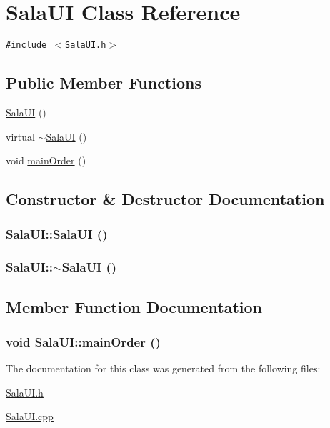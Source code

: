 \hypertarget{class_sala_u_i}{
\section{Sala\-UI Class Reference}
\label{class_sala_u_i}
}
{\tt \#include $<$Sala\-UI.h$>$}

\subsection*{Public Member Functions}
\begin{CompactItemize}
\item 
\hyperlink{class_sala_u_i_2fd138dfa2c3efa7c8ca6864147e5d04}{Sala\-UI} ()
\item 
virtual \hyperlink{class_sala_u_i_5ec383a7722b1f6b7425e115471dbfdf}{$\sim$Sala\-UI} ()
\item 
void \hyperlink{class_sala_u_i_d30e21f7319d652c2a2fd88dc274cfbc}{main\-Order} ()
\end{CompactItemize}


\subsection{Constructor \& Destructor Documentation}
\hypertarget{class_sala_u_i_2fd138dfa2c3efa7c8ca6864147e5d04}{
\subsubsection[SalaUI]{\setlength{\rightskip}{0pt plus 5cm}Sala\-UI::Sala\-UI ()}}
\label{class_sala_u_i_2fd138dfa2c3efa7c8ca6864147e5d04}


\hypertarget{class_sala_u_i_5ec383a7722b1f6b7425e115471dbfdf}{
\subsubsection[$\sim$SalaUI]{\setlength{\rightskip}{0pt plus 5cm}Sala\-UI::$\sim$Sala\-UI ()}}
\label{class_sala_u_i_5ec383a7722b1f6b7425e115471dbfdf}




\subsection{Member Function Documentation}
\hypertarget{class_sala_u_i_d30e21f7319d652c2a2fd88dc274cfbc}{
\subsubsection[mainOrder]{\setlength{\rightskip}{0pt plus 5cm}void Sala\-UI::main\-Order ()}}
\label{class_sala_u_i_d30e21f7319d652c2a2fd88dc274cfbc}




The documentation for this class was generated from the following files:\begin{CompactItemize}
\item 
\hyperlink{_sala_u_i_8h}{Sala\-UI.h}\item 
\hyperlink{_sala_u_i_8cpp}{Sala\-UI.cpp}\end{CompactItemize}
